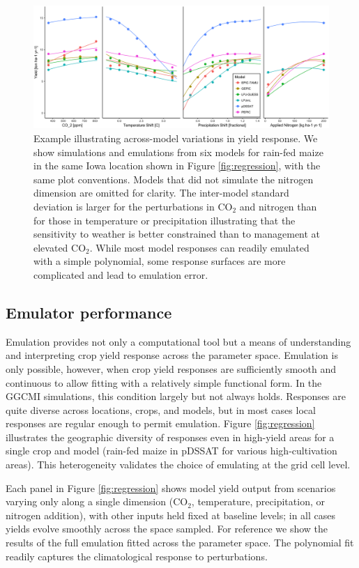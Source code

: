 \documentclass[preprint, 5p, times, twocolumn]{elsarticle}
\begin{document}
{\begin{figure}[!h]
\centering
    \includegraphics[width=0.95\linewidth]{figures/regression_model.png}
    \caption{Example illustrating across-model variations in yield response. We show simulations and emulations from six models for rain-fed maize in the same Iowa location shown in Figure \ref{fig:regression}, with the same plot conventions. Models that did not simulate the nitrogen dimension are omitted for clarity. The inter-model standard deviation is larger for the perturbations in CO$_2$ and nitrogen than for those in temperature or precipitation illustrating that the sensitivity to weather is better constrained than to management at elevated CO$_2$. While most model responses can readily emulated with a simple polynomial, some response surfaces are more complicated and lead to emulation error.}
   \label{fig:regression_iowa}
\end{figure}

\subsection{Emulator performance}
Emulation provides not only a computational tool but a means of understanding and interpreting crop yield response across the parameter space. Emulation is only possible, however, when crop yield responses are sufficiently smooth and continuous to allow fitting with a relatively simple functional form. In the GGCMI simulations, this condition largely but not always holds. 
Responses are quite diverse across locations, crops, and models, but in most cases local responses are regular enough to permit emulation. Figure \ref{fig:regression} illustrates the geographic diversity of responses even in high-yield areas for a single crop and model (rain-fed maize in pDSSAT for various high-cultivation areas).  This heterogeneity validates the choice of emulating at the grid cell level. 

Each panel in Figure \ref{fig:regression} shows model yield output from scenarios varying only along a single dimension (CO$_2$, temperature, precipitation, or nitrogen addition), with other inputs held fixed at baseline levels; in all cases yields evolve smoothly across the space sampled. For reference we show the results of the full emulation fitted across the parameter space. The polynomial fit readily captures the climatological response to perturbations.

}
\end{document}
